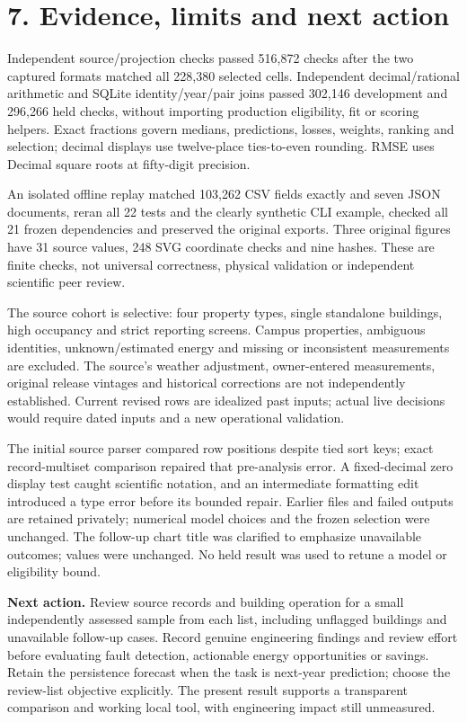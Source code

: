 \documentclass[10pt,letterpaper]{article}
\begin{document}
\newpage
\section*{7. Evidence, limits and next action}
Independent source/projection checks passed 516,872 checks after the two captured formats matched all 228,380 selected cells. Independent decimal/rational arithmetic and SQLite identity/year/pair joins passed 302,146 development and 296,266 held checks, without importing production eligibility, fit or scoring helpers. Exact fractions govern medians, predictions, losses, weights, ranking and selection; decimal displays use twelve-place ties-to-even rounding. RMSE uses Decimal square roots at fifty-digit precision.

An isolated offline replay matched 103,262 CSV fields exactly and seven JSON documents, reran all 22 tests and the clearly synthetic CLI example, checked all 21 frozen dependencies and preserved the original exports. Three original figures have 31 source values, 248 SVG coordinate checks and nine hashes. These are finite checks, not universal correctness, physical validation or independent scientific peer review.

The source cohort is selective: four property types, single standalone buildings, high occupancy and strict reporting screens. Campus properties, ambiguous identities, unknown/estimated energy and missing or inconsistent measurements are excluded. The source's weather adjustment, owner-entered measurements, original release vintages and historical corrections are not independently established. Current revised rows are idealized past inputs; actual live decisions would require dated inputs and a new operational validation.

The initial source parser compared row positions despite tied sort keys; exact record-multiset comparison repaired that pre-analysis error. A fixed-decimal zero display test caught scientific notation, and an intermediate formatting edit introduced a type error before its bounded repair. Earlier files and failed outputs are retained privately; numerical model choices and the frozen selection were unchanged. The follow-up chart title was clarified to emphasize unavailable outcomes; values were unchanged. No held result was used to retune a model or eligibility bound.

\textbf{Next action.} Review source records and building operation for a small independently assessed sample from each list, including unflagged buildings and unavailable follow-up cases. Record genuine engineering findings and review effort before evaluating fault detection, actionable energy opportunities or savings. Retain the persistence forecast when the task is next-year prediction; choose the review-list objective explicitly. The present result supports a transparent comparison and working local tool, with engineering impact still unmeasured.
\end{document}
